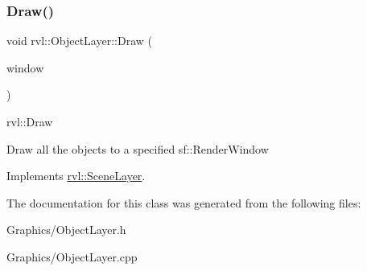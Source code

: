 \subsubsection{\texorpdfstring{Draw()}{Draw()}}
{\footnotesize\ttfamily void rvl\+::\+Object\+Layer\+::\+Draw (\begin{DoxyParamCaption}\item[{sf\+::\+Render\+Window \&}]{window }\end{DoxyParamCaption})\hspace{0.3cm}{\ttfamily [virtual]}}



rvl\+::\+Draw 

Draw all the objects to a specified sf\+::\+Render\+Window 

Implements \hyperlink{classrvl_1_1_scene_layer}{rvl\+::\+Scene\+Layer}.



The documentation for this class was generated from the following files\+:\begin{DoxyCompactItemize}
\item 
Graphics/Object\+Layer.\+h\item 
Graphics/Object\+Layer.\+cpp\end{DoxyCompactItemize}
